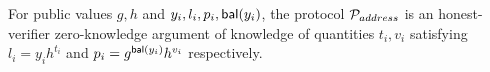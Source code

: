 \begin{lemma}\label{thm:user-proto}
    For public values $g, h$ and $y_i, l_i, p_i, \mathsf{bal}(y_i)$, the protocol
    $\mathcal{P}_{address}$ is an honest-verifier zero-knowledge argument of
    knowledge of quantities $t_i, v_i$ satisfying $l_i = y_ih^{t_i}$ and $p_i =
    g^{\mathsf{bal}(y_i)}h^{v_i}$ respectively.
\end{lemma}

